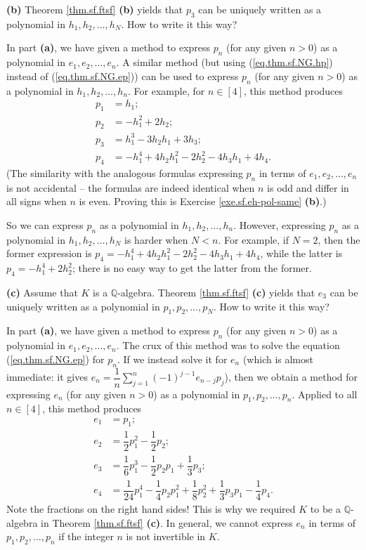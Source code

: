 \begin{example}
\textbf{(b)} Theorem \ref{thm.sf.ftsf} \textbf{(b)} yields that $p_{3}$ can be
uniquely written as a polynomial in $h_{1},h_{2},\ldots,h_{N}$. How to write
it this way?

In part \textbf{(a)}, we have given a method to express $p_{n}$ (for any given
$n>0$) as a polynomial in $e_{1},e_{2},\ldots,e_{n}$. A similar method (but
using (\ref{eq.thm.sf.NG.hp}) instead of (\ref{eq.thm.sf.NG.ep})) can be used
to express $p_{n}$ (for any given $n>0$) as a polynomial in $h_{1}%
,h_{2},\ldots,h_{n}$. For example, for $n\in\left[  4\right]  $, this method
produces%
\begin{align*}
p_{1}  &  =h_{1};\\
p_{2}  &  =-h_{1}^{2}+2h_{2};\\
p_{3}  &  =h_{1}^{3}-3h_{2}h_{1}+3h_{3};\\
p_{4}  &  =-h_{1}^{4}+4h_{2}h_{1}^{2}-2h_{2}^{2}-4h_{3}h_{1}+4h_{4}.
\end{align*}
(The similarity with the analogous formulas expressing $p_{n}$ in terms of
$e_{1},e_{2},\ldots,e_{n}$ is not accidental -- the formulas are indeed
identical when $n$ is odd and differ in all signs when $n$ is even. Proving
this is Exercise \ref{exe.sf.eh-pol-same} \textbf{(b)}.)

So we can express $p_{n}$ as a polynomial in $h_{1},h_{2},\ldots,h_{n}$.
However, expressing $p_{n}$ as a polynomial in $h_{1},h_{2},\ldots,h_{N}$ is
harder when $N<n$. For example, if $N=2$, then the former expression is
$p_{4}=-h_{1}^{4}+4h_{2}h_{1}^{2}-2h_{2}^{2}-4h_{3}h_{1}+4h_{4}$, while the
latter is $p_{4}=-h_{1}^{4}+2h_{2}^{2}$; there is no easy way to get the
latter from the former. \medskip

\textbf{(c)} Assume that $K$ is a $\mathbb{Q}$-algebra. Theorem
\ref{thm.sf.ftsf} \textbf{(c)} yields that $e_{3}$ can be uniquely written as
a polynomial in $p_{1},p_{2},\ldots,p_{N}$. How to write it this way?

In part \textbf{(a)}, we have given a method to express $p_{n}$ (for any given
$n>0$) as a polynomial in $e_{1},e_{2},\ldots,e_{n}$. The crux of this method
was to solve the equation (\ref{eq.thm.sf.NG.ep}) for $p_{n}$. If we instead
solve it for $e_{n}$ (which is almost immediate: it gives $e_{n}=\dfrac{1}%
{n}\sum_{j=1}^{n}\left(  -1\right)  ^{j-1}e_{n-j}p_{j}$), then we obtain a
method for expressing $e_{n}$ (for any given $n>0$) as a polynomial in
$p_{1},p_{2},\ldots,p_{n}$. Applied to all $n\in\left[  4\right]  $, this
method produces%
\begin{align*}
e_{1}  &  =p_{1};\\
e_{2}  &  =\dfrac{1}{2}p_{1}^{2}-\dfrac{1}{2}p_{2};\\
e_{3}  &  =\dfrac{1}{6}p_{1}^{3}-\dfrac{1}{2}p_{2}p_{1}+\dfrac{1}{3}p_{3};\\
e_{4}  &  =\dfrac{1}{24}p_{1}^{4}-\dfrac{1}{4}p_{2}p_{1}^{2}+\dfrac{1}{8}%
p_{2}^{2}+\dfrac{1}{3}p_{3}p_{1}-\dfrac{1}{4}p_{4}.
\end{align*}
Note the fractions on the right hand sides! This is why we required $K$ to be
a $\mathbb{Q}$-algebra in Theorem \ref{thm.sf.ftsf} \textbf{(c)}. In general,
we cannot express $e_{n}$ in terms of $p_{1},p_{2},\ldots,p_{n}$ if the
integer $n$ is not invertible in $K$.


\end{example}
